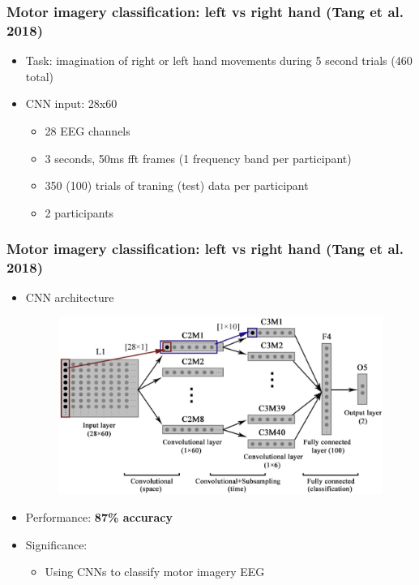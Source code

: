 \documentclass{beamer}
\begin{document}
\begin{frame}
	\frametitle{Motor imagery classification: left vs right hand (Tang et al. 2018)}
	
	\begin{itemize}

		\item Task: imagination of right or left hand movements during 5 second trials (460 total)

		\item CNN input: 28x60 
		\begin{itemize}
			\item 28 EEG channels
			\item 3 seconds, 50ms fft frames (1 frequency band per participant)
			\item 350 (100) trials of traning (test) data per participant 
			\item 2 participants
		\end{itemize}
	\end{itemize}
\end{frame}

\begin{frame}
	\frametitle{Motor imagery classification: left vs right hand (Tang et al. 2018)}

	\begin{itemize}	
		\item CNN architecture
		\begin{figure}
			\centering
			\includegraphics[scale=1.0]{fig7.jpg}
		\end{figure}
	
		\item Performance: \textbf{87\% accuracy}

		\item Significance: 
		\begin{itemize}
			\item Using CNNs to classify motor imagery EEG
		\end{itemize}	

	\end{itemize}

\end{frame}
\end{document}
